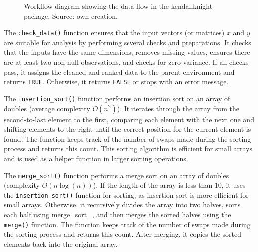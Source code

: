 \documentclass[
  10pt,
  letterpaper,
]{article}
\begin{document}
\begin{figure}


\caption{\label{fig-workflow}Workflow diagram showing the data flow in
the kendallknight package. Source: own creation.}

\end{figure}%

The \texttt{check\_data()} function ensures that the input vectors (or
matrices) \(x\) and \(y\) are suitable for analysis by performing
several checks and preparations. It checks that the inputs have the same
dimensions, removes missing values, ensures there are at least two
non-null observations, and checks for zero variance. If all checks pass,
it assigns the cleaned and ranked data to the parent environment and
returns \texttt{TRUE}. Otherwise, it returns \texttt{FALSE} or stops
with an error message.

The \texttt{insertion\_sort()} function performs an insertion sort on an
array of doubles (average complexity \(O(n^2)\)). It iterates through
the array from the second-to-last element to the first, comparing each
element with the next one and shifting elements to the right until the
correct position for the current element is found. The function keeps
track of the number of swaps made during the sorting process and returns
this count. This sorting algorithm is efficient for small arrays and is
used as a helper function in larger sorting operations.

The \texttt{merge\_sort()} function performs a merge sort on an array of
doubles (complexity \(O(n \log(n))\)). If the length of the array is
less than 10, it uses the \texttt{insertion\_sort()} function for
sorting, as insertion sort is more efficient for small arrays.
Otherwise, it recursively divides the array into two halves, sorts each
half using merge\_sort\_, and then merges the sorted halves using the
\texttt{merge()} function. The function keeps track of the number of
swaps made during the sorting process and returns this count. After
merging, it copies the sorted elements back into the original array.
\end{document}
